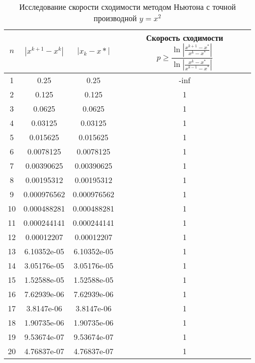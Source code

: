 \documentclass{article}
\begin{document}
    \begin{table}[H]
        \centering
        \caption{Исследование скорости сходимости методом Ньютона с точной производной \mbox{$y = x^2$}}
        \begin{tabular}{|c|c|c|c|}
            \hline
            $n$ & $|x^{k+1} - x^k|$ & $ |x_k - x*|$ & Скорость сходимости $p \geqslant \dfrac{\ln | \frac{x^{k+1}-x^*}{x^k - x^*} |}{\ln |\frac{x^k -x^*}{x^{k-1} - x^*}|}$ \\
            \hline 
            1 & 0.25 & 0.25 & -inf \\ \hline
            2 & 0.125 & 0.125 & 1 \\ \hline
            3 & 0.0625 & 0.0625 & 1 \\ \hline
            4 & 0.03125 & 0.03125 & 1 \\ \hline
            5 & 0.015625 & 0.015625 & 1 \\ \hline
            6 & 0.0078125 & 0.0078125 & 1 \\ \hline
            7 & 0.00390625 & 0.00390625 & 1 \\ \hline
            8 & 0.00195312 & 0.00195312 & 1 \\ \hline
            9 & 0.000976562 & 0.000976562 & 1 \\ \hline
            10 & 0.000488281 & 0.000488281 & 1 \\ \hline
            11 & 0.000244141 & 0.000244141 & 1 \\ \hline
            12 & 0.00012207 & 0.00012207 & 1 \\ \hline
            13 & 6.10352e-05 & 6.10352e-05 & 1 \\ \hline
            14 & 3.05176e-05 & 3.05176e-05 & 1 \\ \hline
            15 & 1.52588e-05 & 1.52588e-05 & 1 \\ \hline
            16 & 7.62939e-06 & 7.62939e-06 & 1 \\ \hline
            17 & 3.8147e-06 & 3.8147e-06 & 1 \\ \hline
            18 & 1.90735e-06 & 1.90735e-06 & 1 \\ \hline
            19 & 9.53674e-07 & 9.53674e-07 & 1 \\ \hline
            20 & 4.76837e-07 & 4.76837e-07 & 1 \\ \hline
        \end{tabular}
    \end{table}
\end{document}
